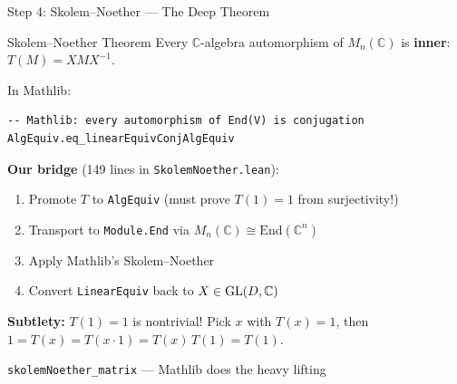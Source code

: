 \documentclass[aspectratio=169,10pt]{beamer}
\begin{document}
\begin{frame}[fragile]{Step 4: Skolem--Noether --- The Deep Theorem}
\vspace{-0.5em}
\begin{block}{Skolem--Noether Theorem}
{\small Every $\mathbb{C}$-algebra automorphism of $M_n(\mathbb{C})$ is \textbf{inner}: $ T(M) = X M X^{-1}$.}
\end{block}
\vspace{-0.1em}
{\small In Mathlib:}
\begin{lstlisting}[basicstyle=\ttfamily\scriptsize\color{white}]
-- Mathlib: every automorphism of End(V) is conjugation
AlgEquiv.eq_linearEquivConjAlgEquiv
\end{lstlisting}
\vspace{-0.1em}
{\small\textbf{Our bridge} (149 lines in \texttt{SkolemNoether.lean}):}
\begin{enumerate}\itemsep0.02em
  \item {\small Promote $T$ to \texttt{AlgEquiv} (must prove $T(1)=1$ from surjectivity!)}
  \item {\small Transport to \texttt{Module.End} via $M_n(\mathbb{C}) \cong \mathrm{End}(\mathbb{C}^n)$}
  \item {\small Apply Mathlib's Skolem--Noether}
  \item {\small Convert \texttt{LinearEquiv} back to $X\in\mathrm{GL}(D,\mathbb{C})$}
\end{enumerate}
\vspace{-0.1em}
{\small\textbf{Subtlety:} $T(1)=1$ is nontrivial! Pick $x$ with $T(x)=1$, then
$1 = T(x) = T(x\cdot 1) = T(x)\,T(1) = T(1)$.}

\vspace{0.1em}
{\small\textcolor{leangreen}{\checkmark}  \texttt{skolemNoether\_matrix} --- Mathlib does the heavy lifting}
\end{frame}
\end{document}
